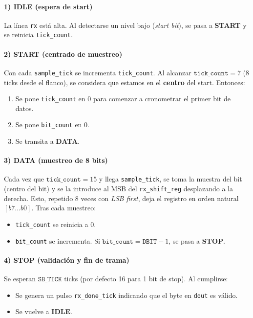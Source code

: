 \paragraph{1) IDLE (espera de start)}  
La línea \texttt{rx} está alta. Al detectarse un nivel bajo (\emph{start bit}), se pasa a \textbf{START} y se reinicia \texttt{tick\_count}.

\paragraph{2) START (centrado de muestreo)}  
Con cada \texttt{sample\_tick} se incrementa \texttt{tick\_count}. Al alcanzar \(\texttt{tick\_count}=7\) (8 ticks desde el flanco), se considera que estamos en el \textbf{centro} del start. Entonces:
\begin{enumerate}
    \item Se pone \texttt{tick\_count} en 0 para comenzar a cronometrar el primer bit de datos.
    \item Se pone \texttt{bit\_count} en 0.
    \item Se transita a \textbf{DATA}.
\end{enumerate}

\paragraph{3) DATA (muestreo de 8 bits)}  
Cada vez que \(\texttt{tick\_count}=15\) y llega \texttt{sample\_tick}, se toma la muestra del bit (centro del bit) y se la introduce al MSB del \texttt{rx\_shift\_reg} desplazando a la derecha. Esto, repetido 8 veces con \textit{LSB first}, deja el registro en orden natural \([b7\ldots b0]\). Tras cada muestreo:
\begin{itemize}
    \item \texttt{tick\_count} se reinicia a 0.
    \item \texttt{bit\_count} se incrementa.  
          Si \(\texttt{bit\_count}= \texttt{DBIT}-1\), se pasa a \textbf{STOP}.
\end{itemize}

\paragraph{4) STOP (validación y fin de trama)}  
Se esperan \(\texttt{SB\_TICK}\) ticks (por defecto 16 para 1 bit de stop). Al cumplirse:
\begin{itemize}
    \item Se genera un pulso \texttt{rx\_done\_tick} indicando que el byte en \texttt{dout} es válido.
    \item Se vuelve a \textbf{IDLE}.
\end{itemize}

